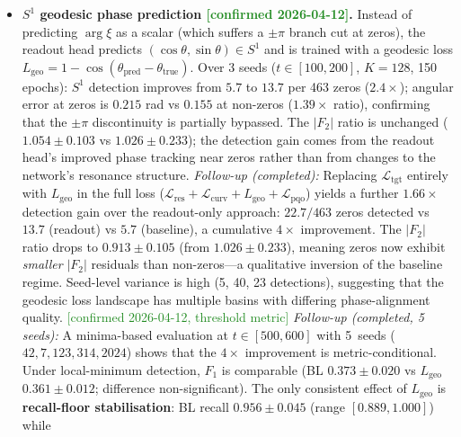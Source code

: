 \documentclass[11pt, a4paper]{article}
\theoremstyle{definition}
\theoremstyle{plain}
\newcommand{\xif}{\xi}                      %
\newcommand{\Lpqo}{\mathcal{L}_{\mathrm{pqo}}}
\newcommand{\Ltgt}{\mathcal{L}_{\mathrm{tgt}}}
\newcommand{\Lcurv}{\mathcal{L}_{\mathrm{curv}}}
\newcommand{\Lres}{\mathcal{L}_{\mathrm{res}}}
\begin{document}
\begin{itemize}
        Since $\xif$ is real on $\sigma=1/2$, the monodromy at
        zeros is trivially $\pm\pi$ (sign change), contributing no
        new information beyond the curvature separation.
  \item \textbf{$S^1$ geodesic phase prediction
        \textcolor{ForestGreen}{[confirmed 2026-04-12]}.}
        Instead of predicting $\arg\xif$ as a scalar (which
        suffers a $\pm\pi$ branch cut at zeros), the readout
        head predicts $(\cos\theta,\sin\theta)\in S^1$ and is
        trained with a geodesic loss
        $L_{\mathrm{geo}}=1-\cos(\theta_{\mathrm{pred}}-
        \theta_{\mathrm{true}})$.
        Over 3 seeds ($t\in[100,200]$, $K=128$, 150 epochs):
        $S^1$ detection improves from $5.7$ to $13.7$ per 463
        zeros ($2.4\times$); angular error at zeros is $0.215$
        rad vs $0.155$ at non-zeros ($1.39\times$ ratio),
        confirming that the $\pm\pi$ discontinuity is partially
        bypassed.  The $|F_2|$ ratio is unchanged
        ($1.054\pm0.103$ vs $1.026\pm0.233$); the detection
        gain comes from the readout head's improved phase
        tracking near zeros rather than from changes to the
        network's resonance structure.
        \emph{Follow-up (completed):} Replacing $\Ltgt$ entirely
        with $L_{\mathrm{geo}}$ in the full loss
        ($\Lres+\Lcurv+L_{\mathrm{geo}}+\Lpqo$)
        yields a further $1.66\times$ detection gain over the
        readout-only approach: $22.7/463$ zeros detected vs $13.7$
        (readout) vs $5.7$ (baseline), a cumulative $4\times$
        improvement.  The $|F_2|$ ratio drops to
        $0.913\pm0.105$ (from $1.026\pm0.233$), meaning zeros now
        exhibit \emph{smaller} $|F_2|$ residuals than non-zeros---a
        qualitative inversion of the baseline regime.  Seed-level
        variance is high (5, 40, 23 detections), suggesting that
        the geodesic loss landscape has multiple basins with
        differing phase-alignment quality.
        \textcolor{ForestGreen}{[confirmed 2026-04-12, threshold metric]}
        \emph{Follow-up (completed, 5 seeds):}
        A minima-based evaluation at $t\in[500,600]$ with 5~seeds
        ($42, 7, 123, 314, 2024$) shows that the $4\times$
        improvement is metric-conditional.  Under local-minimum
        detection, $F_1$ is comparable
        (BL $0.373\pm0.020$ vs $L_{\mathrm{geo}}$
        $0.361\pm0.012$; difference non-significant).
        The only consistent effect of $L_{\mathrm{geo}}$ is
        \textbf{recall-floor stabilisation}: BL recall
        $0.956\pm0.045$ (range $[0.889,1.000]$) while

\end{itemize}
\end{document}
